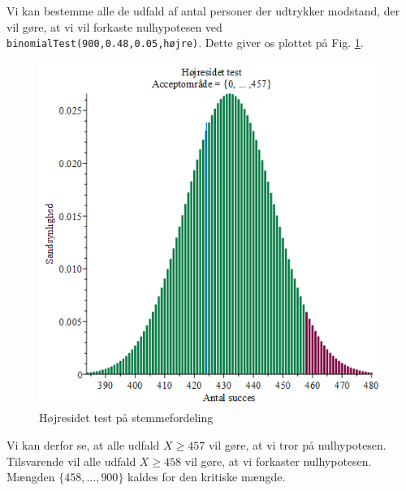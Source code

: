 Vi kan bestemme alle de udfald af antal personer der udtrykker modstand, der vil gøre, at vi vil forkaste nulhypotesen ved \texttt{binomialTest(900,0.48,0.05,højre)}. Dette giver os plottet på Fig. \ref{fig:højretest}.
\begin{figure}[H]
\includegraphics[width=\textwidth]{Billeder/binomialtest.png}
\caption{Højresidet test på stemmefordeling}
\label{fig:højretest}
\end{figure}

Vi kan derfor se, at alle udfald $X\geq 457$ vil gøre, at vi tror på nulhypotesen. Tilsvarende vil alle udfald $X\geq 458$ vil gøre, at vi forkaster nulhypotesen. Mængden $\{458,\hdots,900\}$ kaldes for den kritiske mængde. 

